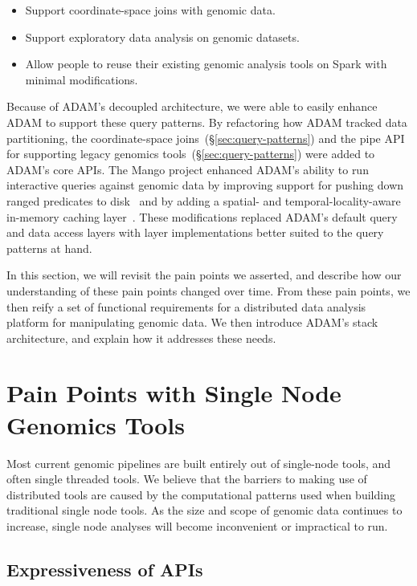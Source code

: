 \documentclass[phd]{ucbthesis}
\begin{document}
\begin{itemize}
\item Support coordinate-space joins with genomic data.
\item Support exploratory data analysis on genomic datasets.
\item Allow people to reuse their existing genomic analysis tools on Spark with
  minimal modifications.
\end{itemize}

Because of {ADAM}'s decoupled architecture, we were able to easily
enhance {ADAM} to support these query patterns. By refactoring how
{ADAM} tracked data partitioning, the coordinate-space
joins~(\S\ref{sec:query-patterns}) and the {pipe} API for supporting
legacy genomics tools~(\S\ref{sec:query-patterns}) were added to {ADAM}'s
core APIs. The {Mango} project enhanced {ADAM}'s ability to run
interactive queries against genomic data by improving support for pushing down
ranged predicates to disk~\cite{tu16} and by adding a spatial- and
temporal-locality-aware in-memory caching layer~\cite{morrow17}. These modifications
replaced {ADAM}'s default query and data access layers with layer
implementations better suited to the query patterns at hand.

In this section, we will revisit the pain points we asserted, and describe
how our understanding of these pain points changed over time. From these pain
points, we then reify a set of functional requirements for a distributed data
analysis platform for manipulating genomic data. We then introduce
{ADAM}'s stack architecture, and explain how it addresses these needs.

\section{Pain Points with Single Node Genomics Tools}
\label{sec:pain-points}

Most current genomic pipelines are built entirely out of single-node tools,
and often single threaded tools. We believe that the barriers to making
use of distributed tools are caused by the computational patterns used when
building traditional single node tools. As the size and scope of genomic data
continues to increase, single node analyses will become inconvenient or
impractical to run.

\subsection{Expressiveness of APIs}
\label{sec:api-levels}
\end{document}
